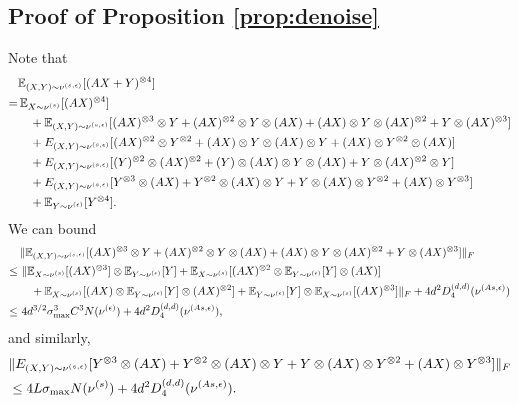 \subsection{Proof of Proposition \ref{prop:denoise}} 
\label{subsec:denoise}
Note that 
\begin{align*}
& \mathbb{E}_{(X,Y)\sim \nu^{(s,\epsilon)}} [(AX+Y)^{\otimes 4}]\\
 = & \,\mathbb{E}_{X\sim \nu^{(s)}}[(AX)^{\otimes 4}] \\
& \quad+ \mathbb{E}_{(X,Y)\sim \nu^{(s,\epsilon)}} [(AX)^{\otimes 3}\otimes Y + (AX)^{\otimes 2}\otimes Y\otimes (AX) + (AX)\otimes Y\otimes (AX)^{\otimes 2} + Y\otimes (AX)^{\otimes 3}] \\
& \quad+ E_{(X,Y)\sim \nu^{(s,\epsilon)}} [ (AX)^{\otimes 2}\otimes Y^{\otimes 2} + (AX)\otimes Y\otimes (AX)\otimes Y + (AX)\otimes Y^{\otimes 2}\otimes (AX)]\\
& \quad+  E_{(X,Y)\sim \nu^{(s,\epsilon)}} [ (Y)^{\otimes 2}\otimes (AX)^{\otimes 2} + (Y)\otimes (AX)\otimes Y\otimes (AX) + Y\otimes (AX)^{\otimes 2}\otimes Y] \\
& \quad+ E_{(X,Y)\sim \nu^{(s,\epsilon)}} [Y^{\otimes 3}\otimes (AX) + Y^{\otimes 2}\otimes (AX)\otimes Y + Y\otimes (AX)\otimes Y^{\otimes 2} + (AX)\otimes Y^{\otimes 3}] \\
& \quad+ \mathbb{E}_{Y\sim \nu^{(\epsilon)}}[Y^{\otimes 4}].
\end{align*}
We can bound
\begin{align*}
& \| \mathbb{E}_{(X,Y)\sim \nu^{(s,\epsilon)}} [(AX)^{\otimes 3}\otimes Y + (AX)^{\otimes 2}\otimes Y\otimes (AX) + (AX)\otimes Y\otimes (AX)^{\otimes 2} + Y\otimes (AX)^{\otimes 3}] \|_F \\
\le \,& \,  \| \mathbb{E}_{X\sim \nu^{(s)}} [(AX)^{\otimes 3}] \otimes \mathbb{E}_{Y\sim \nu^{(\epsilon)}}[Y] + \mathbb{E}_{X\sim \nu^{(s)}} [(AX)^{\otimes 2} \otimes \mathbb{E}_{Y\sim \nu^{(\epsilon)}}[Y] \otimes (AX)] \\
& \quad + \mathbb{E}_{X\sim \nu^{(s)}} [(AX) \otimes \mathbb{E}_{Y\sim \nu^{(\epsilon)}}[Y] \otimes (AX)^{\otimes 2}]  + \mathbb{E}_{Y\sim \nu^{(\epsilon)}}[Y] \otimes \mathbb{E}_{X\sim \nu^{(s)}} [(AX)^{\otimes 3}] \|_F + 4d^2D_4^{(d,d)}(\nu^{(As,\epsilon)}) \\
\le \, & \,4d^{3/2}\sigma^3_{\max}C^3N(\nu^{(\epsilon)}) + 4d^2D_4^{(d,d)}(\nu^{(As,\epsilon)}),
\end{align*}
and similarly, 
\begin{align*}
& \| E_{(X,Y)\sim \nu^{(s,\epsilon)}} [Y^{\otimes 3}\otimes (AX) + Y^{\otimes 2}\otimes (AX)\otimes Y + Y\otimes (AX)\otimes Y^{\otimes 2} + (AX)\otimes Y^{\otimes 3}] \|_F \\
& \le 4L\sigma_{\max}N(\nu^{(s)})+ 4d^2D_4^{(d,d)}(\nu^{(As,\epsilon)}).
\end{align*}
